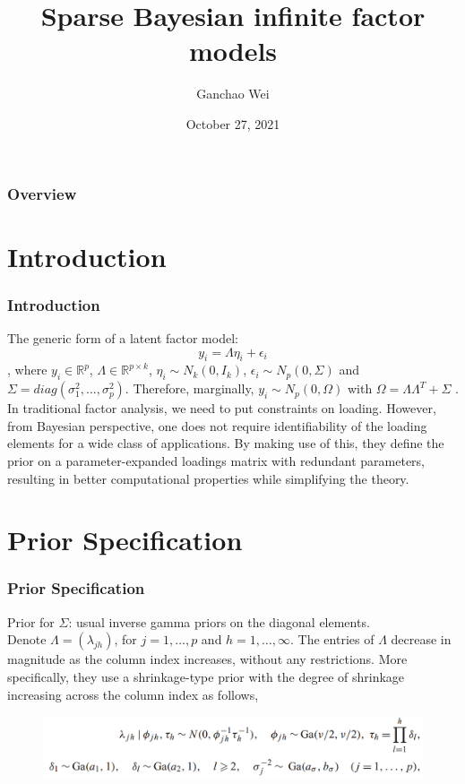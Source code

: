 \documentclass{beamer}
\title[BFA]{Sparse Bayesian infinite factor models}
\author{Ganchao Wei}
\date{October 27, 2021}
\begin{document}
	
	\begin{frame}
		\titlepage %
	\end{frame}
	
	\begin{frame}
		\frametitle{Overview} %
		\tableofcontents
	\end{frame}
	
	
	\section{Introduction}
	
	\begin{frame}
		\frametitle{Introduction}
		The generic form of a latent factor model:
		$$y_i = \Lambda \eta_i + \epsilon_i$$
		, where $y_i \in \mathbb{R}^p$, $\Lambda \in \mathbb{R}^{p \times k}$, $\eta_i \sim N_k(0, I_k)$, $\epsilon_i \sim N_p(0, \Sigma)$ and $\Sigma = diag(\sigma_1^2,\ldots, \sigma_p^2)$. Therefore, marginally, $y_i \sim N_p(0, \Omega)$ with $\Omega = \Lambda \Lambda^{T} + \Sigma$	.\\
		\vspace{\baselineskip}
		In traditional factor analysis, we need to put constraints on loading. However, from Bayesian perspective, one does not require identifiability of the loading elements for a wide class of applications.  By making use of this, they define the prior on a parameter-expanded loadings matrix with redundant parameters, resulting in better computational properties while simplifying the theory.
	\end{frame}
	
	\section{Prior Specification}
	\begin{frame}
		\frametitle{Prior Specification}
		Prior for $\Sigma$: usual inverse gamma priors on the diagonal elements.\\
		\vspace{\baselineskip}
		Denote $\Lambda = (\lambda_{jh})$, for $j=1,\ldots,p$ and $h=1,\ldots,\infty$. The entries of $\Lambda$ decrease in magnitude as the column index increases, without any restrictions. More specifically, they use a shrinkage-type prior with the degree of shrinkage increasing across the column index as follows,
		\begin{figure}
			\includegraphics[width=0.9\linewidth]{image001.png}
		\end{figure}
		
	\end{frame}
	
\end{document}
